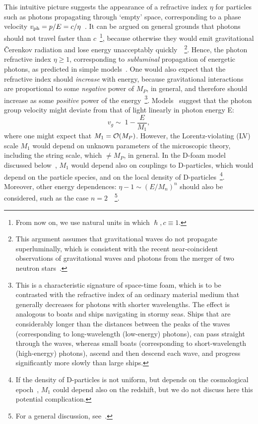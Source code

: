 \documentclass[12pt]{article}
\begin{document}
This intuitive picture suggests the appearance of a refractive index $\eta$ for particles such as photons propagating through
`empty' space, corresponding to a phase velocity $v_{\rm ph} = p/E = c/\eta$~\cite{dfoam}. It can be argued
on general grounds that photons should not travel faster than $c$~\footnote{From now on, we use natural
units in which $\hslash, c \equiv 1$.}, because otherwise they
would emit gravitational {\v C}erenkov radiation and lose energy unacceptably quickly~\cite{KT}~\footnote{This
argument assumes that gravitational waves do not propagate superluminally, which is consistent with the recent near-coincident
observations of gravitational waves and photons from the merger of two neutron stars~\cite{NS-NS}.}.
Hence, the photon refractive  index $\eta \ge 1$, corresponding to
{\it subluminal} propagation of energetic photons, as predicted in simple models~\cite{dfoam,loop,pospelov,dsr}.
One would also expect that the refractive index
should {\it increase} with energy, because gravitational interactions are proportional to some {\it negative} power of $M_P$, in general,
and therefore should increase as some {\it positive} power of the energy~\footnote{This is a characteristic signature of space-time foam,
which is to be contrasted with the refractive index of an ordinary material medium that generally decreases for photons with
shorter wavelengths. The effect is analogous to boats and ships navigating in stormy seas.
Ships that are considerably longer than the distances between the peaks of the waves (corresponding to long-wavelength (low-energy) photons),
can pass straight through the waves, whereas small boats (corresponding to short-wavelength (high-energy) photons), ascend
and then descend each wave, and progress significantly more slowly than large ships.}.
Models~\cite{dfoam,loop,pospelov,dsr} suggest that the
photon group velocity might deviate from that of light linearly in photon energy E:
\begin{equation}\label{mdr1}
v_g \sim \; 1 - \frac{E}{M_1} ,
\end{equation}
where one might expect that $M_1 = {\cal O}(M_P)$. However, the Lorentz-violating (LV) scale
$M_1$ would depend on unknown parameters of the microscopic theory, including
the string scale, which $\ne M_P$, in general. In the D-foam model discussed below~\cite{dfoam}, $M_1$
would depend also on couplings to D-particles, which would depend on the particle species,
and on the local density of D-particles~\footnote{If the density of D-particles is not uniform,
but depends on the cosmological epoch~\cite{emnewuncert},
$M_1$ could depend also on the redshift, but we do not discuss here this potential complication.}. Moreover,  other energy
dependences: $\eta - 1 \sim (E/M_n)^n$ should also be considered, such as the case
$n = 2$~\cite{mitsou, EMNSS}~\footnote{For a general discussion, see~\cite{pfifer}.}.
\end{document}
